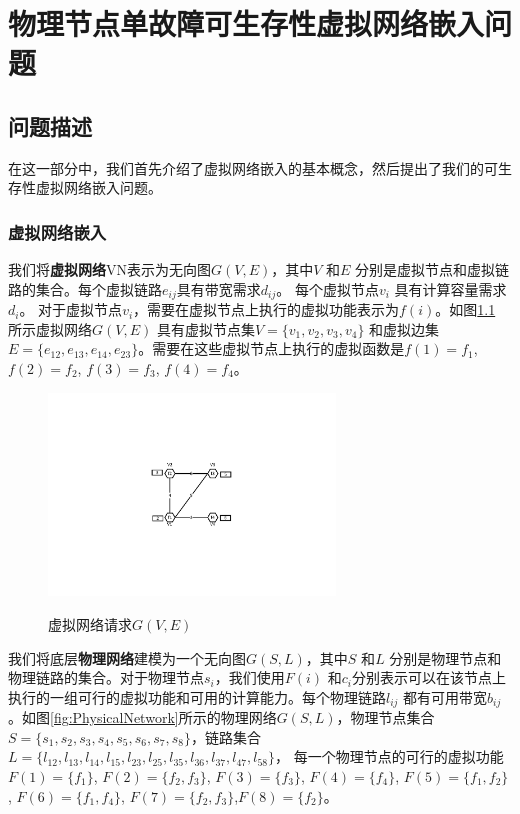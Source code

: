 \chapter{物理节点单故障可生存性虚拟网络嵌入问题}
\section{问题描述}
在这一部分中，我们首先介绍了虚拟网络嵌入的基本概念，然后提出了我们的可生存性虚拟网络嵌入问题。
\subsection{虚拟网络嵌入}
我们将\textbf{虚拟网络}VN表示为无向图$G (V,E)$，其中$V$ 和$E$ 分别是虚拟节点和虚拟链路的集合。每个虚拟链路$e_{ij}$具有带宽需求$d_{ij}$。 每个虚拟节点$v_i$ 具有计算容量需求$d_i$。 对于虚拟节点$v_i$，需要在虚拟节点上执行的虚拟功能表示为$f(i)$。如图\ref{fig:VirtualNetworkRequest} 所示虚拟网络$G (V,E)$ 具有虚拟节点集$V=\{v_1,v_2,v_3,v_4\}$ 和虚拟边集$E= \{e_{12},e_{13},e_{14},e_{23}\}$。需要在这些虚拟节点上执行的虚拟函数是$f(1)=f_1$, $f(2)=f_2$, $f(3)=f_3$, $f(4)=f_4$。

\begin{figure}[htbp]
\centering
\includegraphics[width=3.0in]{figures/VirtualNetworkRequest}\\
\caption{虚拟网络请求$G(V,E)$
}\label{fig:VirtualNetworkRequest}
\end{figure}

我们将底层\textbf{物理网络}建模为一个无向图$G (S,L)$，其中$S$ 和$L$ 分别是物理节点和物理链路的集合。对于物理节点$s_i$，我们使用$F(i)$ 和$c_i$分别表示可以在该节点上执行的一组可行的虚拟功能和可用的计算能力。每个物理链路$l_{ij}$ 都有可用带宽$b_{ij}$。如图\ref{fig:PhysicalNetwork}所示的物理网络$G (S,L)$，物理节点集合$S=\{s_1,s_2,s_3,s_4,s_5,s_6,s_7,s_8\}$，链路集合$L=\{l_{12},l_{13},l_{14},l_{15},l_{23},l_{25},l_{35},l_{36},l_{37},l_{47},l_{58}\}$，
每一个物理节点的可行的虚拟功能$F(1)=\{f_1\}$, $F(2)=\{f_2,f_3\}$, $F(3)=\{f_3\}$, $F(4)=\{f_4\}$, $F(5)=\{f_1,f_2\}$, $F(6)=\{f_1,f_4\}$, $F(7)=\{f_2,f_3\}$,$F(8)=\{f_2\}$。

